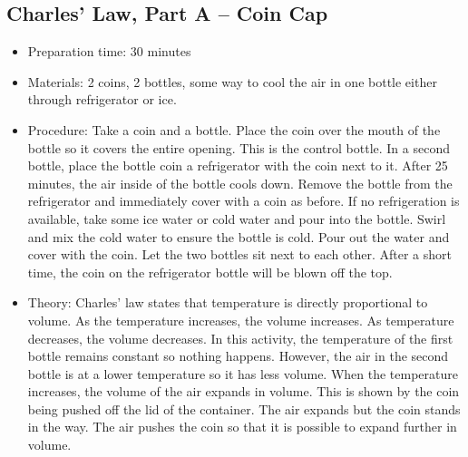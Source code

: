 \subsection{Charles’ Law, Part A – Coin Cap}
\begin{itemize}
\item{Preparation time: 30 minutes}
\item{Materials: 2 coins, 2 bottles, some way to cool the air in one bottle either through refrigerator or ice.}
\item{Procedure: Take a coin and a bottle. Place the coin over the mouth of the bottle so it covers the entire opening. This is the control bottle. In a second bottle, place the bottle coin a refrigerator with the coin next to it. After 25 minutes, the air inside of the bottle cools down. Remove the bottle from the refrigerator and immediately cover with a coin as before. If no refrigeration is available, take some ice water or cold water and pour into the bottle. Swirl and mix the cold water to ensure the bottle is cold. Pour out the water and cover with the coin. Let the two bottles sit next to each other. After a short time, the coin on the refrigerator bottle will be blown off the top. }
\item{Theory: Charles’ law states that temperature is directly proportional to volume. As the temperature increases, the volume increases. As temperature decreases, the volume decreases. In this activity, the temperature of the first bottle remains constant so nothing happens. However, the air in the second bottle is at a lower temperature so it has less volume. When the temperature increases, the volume of the air expands in volume. This is shown by the coin being pushed off the lid of the container. The air expands but the coin stands in the way. The air pushes the coin so that it is possible to expand further in volume.}
\end{itemize}

